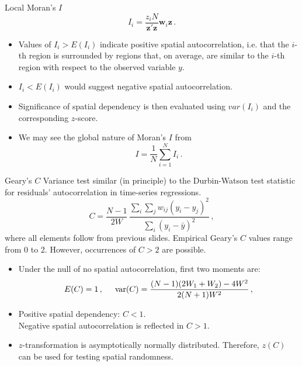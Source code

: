 \documentclass{beamer}
\begin{document}
\begin{frame}{Local Moran's $I$}
    \begin{equation*}
    I_i = \frac{z_iN}{\bm{z}'\bm{z}}\bm{w}_{i}\bm{z} \, .
    \end{equation*}    
\begin{itemize}
    \item Values of $I_i > E(I_i)$ indicate positive spatial autocorrelation, i.e. that the $i$-th region is surrounded by regions that, on average, are similar to the $i$-th region with respect to the observed variable $y$. 
    \item $I_i < E(I_i)$ would suggest negative spatial autocorrelation.
    \item Significance of spatial dependency is then evaluated using $var(I_i)$ and the corresponding $z$-score.
    \bigskip
    \item We may see the global nature of Moran's $I$ from
    \begin{equation*} 
    I = \frac{1}{N}\sum_{i=1}^N I_{i} \,.
    \end{equation*}   
\end{itemize}
\end{frame}
\begin{frame}{Geary's $C$}
 Variance test similar (in principle) to the Durbin-Watson test statistic for residuals' autocorrelation in time-series regressions.
 \begin{equation*}
C = \frac{N-1}{2W}\,
    \frac{\sum_{i}\sum_{j}w_{ij}(y_i-y_j)^2}
         {\sum_{i}(y_i-\bar{y})^2} \,,
\end{equation*}   
where all elements follow from previous slides. Empirical Geary's $C$ values range from 0 to 2. However, occurrences of $C>2$ are possible.\\
\smallskip
\begin{itemize}
    \item Under the null of no spatial autocorrelation, first two moments are:
\begin{equation*}
E(C) = 1\, ,\hspace{0.5cm}
\textnormal{var}(C) = \frac{(N-1)(2W_1 + W_2) - 4W^2 }{2(N+1)W^2} \,,
\end{equation*}  
\item Positive spatial dependency: $C < 1$.\\ Negative spatial autocorrelation is reflected in $C > 1$.
\smallskip
\item $z$-transformation is asymptotically normally distributed. Therefore, $z(C)$ can be used for testing spatial randomness.
\end{itemize}
\end{frame}
\end{document}
